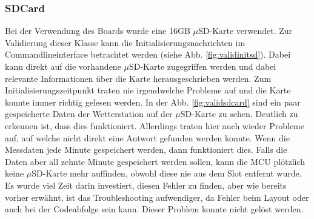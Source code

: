 \subsubsection{SDCard}
\label{subsubsec:valSDCard}
\begin{minipage}[b][6.5cm][t]{0.48\textwidth}
Bei der Verwendung des Boards wurde eine 16GB $\mu$SD-Karte verwendet. Zur Validierung dieser Klasse kann die Initialisierungsnachrichten im Commandlineinterface betrachtet werden (siehe Abb. \ref{fig:validinitsd}). Dabei kann direkt auf die vorhandene $\mu$SD-Karte zugegriffen werden und dabei relevante Informationen über die Karte herausgeschrieben werden. Zum Initialisierungszeitpunkt traten nie irgendwelche Probleme auf und die Karte konnte immer richtig gelesen werden. In der Abb. \ref{fig:validsdcard} sind ein paar gespeicherte Daten der Wetterstation auf der $\mu$SD-Karte zu sehen. Deutlich zu erkennen ist, dass dies funktioniert. Allerdings traten hier auch wieder Probleme auf, auf welche nicht direkt eine Antwort gefunden werden konnte. Wenn die Messdaten jede Minute gespeichert werden, dann funktioniert dies. Falls die Daten aber all zehnte Minute gespeichert werden sollen, kann die MCU plötzlich keine $\mu$SD-Karte mehr auffinden, obwohl diese nie aus dem Slot entfernt wurde. Es wurde viel Zeit darin investiert, diesen Fehler zu finden, aber wie bereits vorher erwähnt, ist das Troubleshooting aufwendiger, da Fehler beim Layout oder auch bei der Codeabfolge sein kann. Dieser Problem konnte nicht gelöst werden.\\
\end{minipage}
